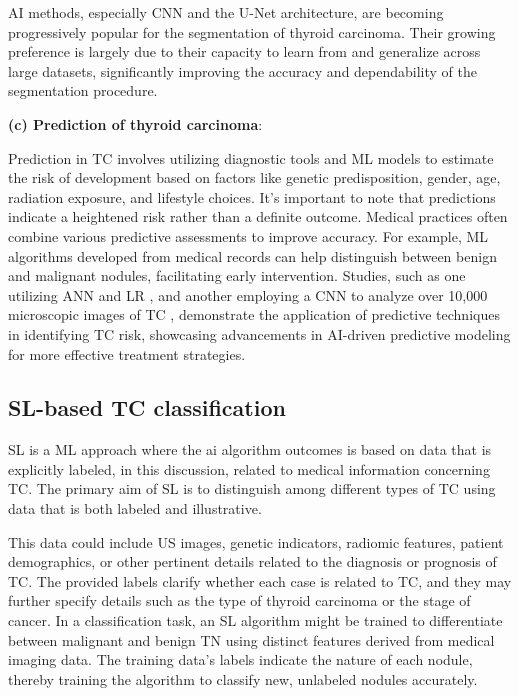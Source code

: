 \documentclass[a4paper,fleqn]{cas-sc}
\begin{document}
\ac{AI} methods, especially \ac{CNN} and the U-Net architecture, are becoming progressively popular for the segmentation of thyroid carcinoma. Their growing preference is largely due to their capacity to learn from and generalize across large datasets, significantly improving the accuracy and dependability of the segmentation procedure.

\vskip2mm
\noindent \textbf{(c) Prediction of thyroid carcinoma}: 


Prediction in TC involves utilizing diagnostic tools and \ac{ML} models to estimate the risk of development based on factors like genetic predisposition, gender, age, radiation exposure, and lifestyle choices. It's important to note that predictions indicate a heightened risk rather than a definite outcome. Medical practices often combine various predictive assessments to improve accuracy. For example, \ac{ML} algorithms developed from medical records can help distinguish between benign and malignant nodules, facilitating early intervention. Studies, such as one utilizing \ac{ANN}  and \ac{LR} \cite{jajroudi2014prediction}, and another employing a \ac{CNN} to analyze over 10,000 microscopic images of TC \cite{sajeev2020thyroid}, demonstrate the application of predictive techniques in identifying TC risk, showcasing advancements in AI-driven predictive modeling for more effective treatment strategies.




\subsection{SL-based TC classification}
\Ac{SL} is a \ac{ML} approach where the ai algorithm  outcomes is  based on data that is explicitly labeled, in this discussion, related to medical information concerning TC. The primary aim of \ac{SL} is to distinguish among different types of TC using data that is both labeled and illustrative.

This data could include \ac{US} images, genetic indicators, radiomic features, patient demographics, or other pertinent details related to the diagnosis or prognosis of TC. The provided labels clarify whether each case is related to TC, and they may further specify details such as the type of thyroid carcinoma or the stage of cancer. In a classification task, an \ac{SL} algorithm might be trained to differentiate between malignant and benign \ac{TN} using distinct features derived from medical imaging data. The training data's labels indicate the nature of each nodule, thereby training the algorithm to classify new, unlabeled nodules accurately.
\end{document}
